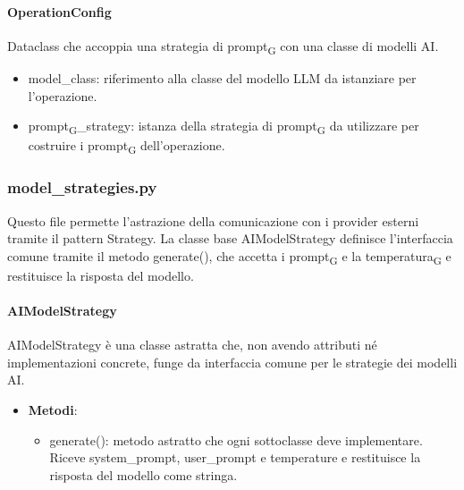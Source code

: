 \documentclass[11pt,a4paper]{article}
\newcommand{\gls}[1]{#1\textsubscript{G}}
\begin{document}
\paragraph{OperationConfig}
Dataclass che accoppia una strategia di \gls{prompt} con una classe di modelli AI.
\begin{itemize}
\item model\_class: riferimento alla classe del modello LLM da istanziare per l'operazione.
\item \gls{prompt}\_strategy: istanza della strategia di \gls{prompt} da utilizzare per costruire i \gls{prompt} dell'operazione.
\end{itemize}

\subsubsection{model\_strategies.py}
Questo file permette l'astrazione della comunicazione con i provider esterni tramite il pattern Strategy. La classe base AIModelStrategy definisce l'interfaccia comune tramite il metodo generate(), che accetta i \gls{prompt} e la \gls{temperatura} e restituisce la risposta del modello.

\paragraph{AIModelStrategy} 
AIModelStrategy è una classe astratta che, non avendo attributi né implementazioni concrete, funge da interfaccia comune per le strategie dei modelli AI.
\begin{itemize}

\item \textbf{Metodi}: 

\begin{itemize}
\item generate(): metodo astratto che ogni sottoclasse deve implementare. Riceve system\_prompt, user\_prompt e temperature e restituisce la risposta del modello come stringa.
\end{itemize}

\end{itemize}
\end{document}
